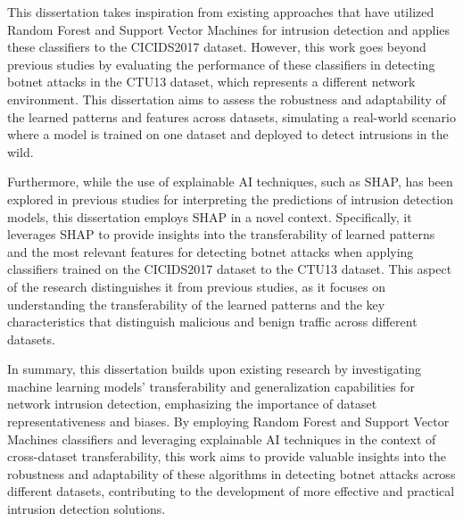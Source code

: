 This dissertation takes inspiration from existing approaches that have utilized Random Forest and Support Vector Machines for intrusion detection and applies these classifiers to the CICIDS2017 dataset. However, this work goes beyond previous studies by evaluating the performance of these classifiers in detecting botnet attacks in the CTU13 dataset, which represents a different network environment. This dissertation aims to assess the robustness and adaptability of the learned patterns and features across datasets, simulating a real-world scenario where a model is trained on one dataset and deployed to detect intrusions in the wild.

Furthermore, while the use of explainable AI techniques, such as SHAP, has been explored in previous studies for interpreting the predictions of intrusion detection models, this dissertation employs SHAP in a novel context. Specifically, it leverages SHAP to provide insights into the transferability of learned patterns and the most relevant features for detecting botnet attacks when applying classifiers trained on the CICIDS2017 dataset to the CTU13 dataset. This aspect of the research distinguishes it from previous studies, as it focuses on understanding the transferability of the learned patterns and the key characteristics that distinguish malicious and benign traffic across different datasets.

In summary, this dissertation builds upon existing research by investigating machine learning models' transferability and generalization capabilities for network intrusion detection, emphasizing the importance of dataset representativeness and biases. By employing Random Forest and Support Vector Machines classifiers and leveraging explainable AI techniques in the context of cross-dataset transferability, this work aims to provide valuable insights into the robustness and adaptability of these algorithms in detecting botnet attacks across different datasets, contributing to the development of more effective and practical intrusion detection solutions.